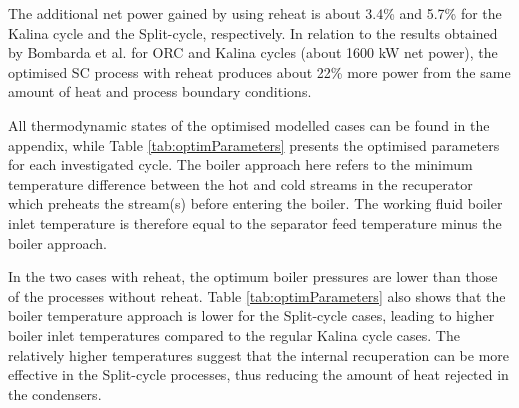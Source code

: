 \documentclass[review,3p]{elsarticle}
\begin{document}
The additional net power gained by using reheat is about 3.4\% and 5.7\% for the Kalina cycle and the Split-cycle, respectively. In relation to the results obtained by Bombarda et al. \cite{Bombarda2010b} for ORC and Kalina cycles (about 1600 kW net power), the optimised SC process with reheat produces about 22\% more power from the same amount of heat and process boundary conditions. 

All thermodynamic states of the optimised modelled cases can be found in the appendix, while Table \ref{tab:optimParameters} presents the optimised parameters for each  investigated cycle. The boiler approach here refers to the minimum temperature difference between the hot and cold streams in the recuperator which preheats the stream(s) before entering the boiler. The working fluid boiler inlet temperature is therefore equal to the separator feed temperature minus the boiler approach. 

In the two cases with reheat, the optimum boiler pressures are lower than those of the processes without reheat. Table \ref{tab:optimParameters} also shows that the boiler temperature approach is lower for the Split-cycle cases, leading to higher boiler inlet temperatures compared to the regular Kalina cycle cases.  The relatively higher temperatures suggest that the internal recuperation can be more effective in the Split-cycle processes, thus reducing the amount of heat rejected in the condensers.
\end{document}
